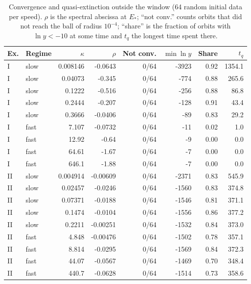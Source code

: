 \begin{table}[t]
\centering\small
\caption{Convergence and quasi-extinction outside the window (64 random initial data per speed). $\rho$ is the spectral abscissa at $E_*$; ``not conv.'' counts orbits that did not reach the ball of radius $10^{-4}$; ``share'' is the fraction of orbits with $\ln y<-10$ at some time and $t_q$ the longest time spent there.}
\label{tab:limits}
\setlength{\tabcolsep}{6pt}
\begin{tabular}{llrrrrrr}
\toprule
Ex. & Regime & $\kappa$ & $\rho$ & Not conv. & $\min\ln y$ & Share & $t_q$\\
\midrule
I & slow & 0.008146 & -0.0643 & 0/64 & -3923 & 0.92 & 1354.1\\
I & slow & 0.04073 & -0.345 & 0/64 & -774 & 0.88 & 265.6\\
I & slow & 0.1222 & -0.516 & 0/64 & -256 & 0.88 & 86.8\\
I & slow & 0.2444 & -0.207 & 0/64 & -128 & 0.91 & 43.4\\
I & slow & 0.3666 & -0.0406 & 0/64 & -89 & 0.83 & 29.2\\
I & fast & 7.107 & -0.0732 & 0/64 & -11 & 0.02 & 1.0\\
I & fast & 12.92 & -0.64 & 0/64 & -9 & 0.00 & 0.0\\
I & fast & 64.61 & -1.67 & 0/64 & -7 & 0.00 & 0.0\\
I & fast & 646.1 & -1.88 & 0/64 & -7 & 0.00 & 0.0\\
II & slow & 0.004914 & -0.00609 & 0/64 & -2371 & 0.83 & 545.9\\
II & slow & 0.02457 & -0.0246 & 0/64 & -1560 & 0.83 & 374.8\\
II & slow & 0.07371 & -0.0188 & 0/64 & -1546 & 0.81 & 371.1\\
II & slow & 0.1474 & -0.0104 & 0/64 & -1556 & 0.86 & 377.2\\
II & slow & 0.2211 & -0.00251 & 0/64 & -1532 & 0.84 & 373.0\\
II & fast & 4.848 & -0.00476 & 0/64 & -1502 & 0.78 & 357.1\\
II & fast & 8.814 & -0.0295 & 0/64 & -1569 & 0.84 & 372.3\\
II & fast & 44.07 & -0.0567 & 0/64 & -1469 & 0.70 & 348.4\\
II & fast & 440.7 & -0.0628 & 0/64 & -1514 & 0.73 & 358.6\\
\bottomrule
\end{tabular}
\end{table}
